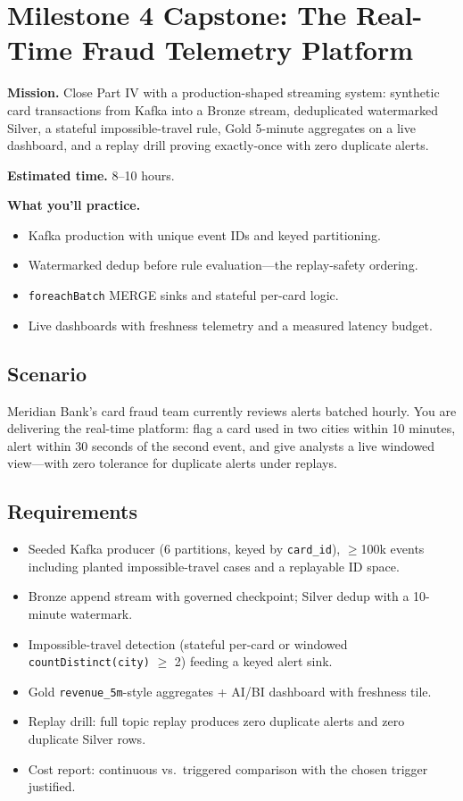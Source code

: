 \section{Milestone 4 Capstone: The Real-Time Fraud Telemetry Platform}\label{sec:ch16-capstone}

\begin{capstonebox}
\textbf{Mission.} Close Part IV with a production-shaped streaming system: synthetic card transactions from Kafka into a Bronze stream, deduplicated watermarked Silver, a stateful impossible-travel rule, Gold 5-minute aggregates on a live dashboard, and a replay drill proving exactly-once with zero duplicate alerts.

\textbf{Estimated time.} 8--10 hours.

\textbf{What you'll practice.}
\begin{itemize}
    \item Kafka production with unique event IDs and keyed partitioning.
    \item Watermarked dedup before rule evaluation---the replay-safety ordering.
    \item \texttt{foreachBatch} MERGE sinks and stateful per-card logic.
    \item Live dashboards with freshness telemetry and a measured latency budget.
\end{itemize}
\end{capstonebox}

\subsection*{Scenario}
Meridian Bank's card fraud team currently reviews alerts batched hourly. You are delivering the real-time platform: flag a card used in two cities within 10 minutes, alert within 30 seconds of the second event, and give analysts a live windowed view---with zero tolerance for duplicate alerts under replays.

\subsection*{Requirements}
\begin{itemize}
    \item Seeded Kafka producer (6 partitions, keyed by \texttt{card\_id}), $\geq$100k events including planted impossible-travel cases and a replayable ID space.
    \item Bronze append stream with governed checkpoint; Silver dedup with a 10-minute watermark.
    \item Impossible-travel detection (stateful per-card or windowed \texttt{countDistinct(city)} $\geq$ 2) feeding a keyed alert sink.
    \item Gold \texttt{revenue\_5m}-style aggregates + AI/BI dashboard with freshness tile.
    \item Replay drill: full topic replay produces zero duplicate alerts and zero duplicate Silver rows.
    \item Cost report: continuous vs.\ triggered comparison with the chosen trigger justified.
\end{itemize}

